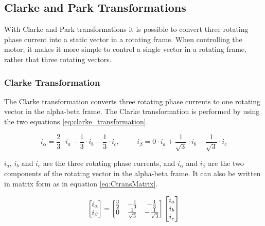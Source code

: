 
\subsection{Clarke and Park Transformations}
With Clarke and Park transformations it is possible to convert three rotating phase current into a static vector in a rotating frame. When controlling the motor, it makes it more simple to control a single vector in a rotating frame, rather that three rotating vectors.



\subsubsection{Clarke Transformation}
The Clarke transformation converts three rotating phase currents to one rotating vector in the alpha-beta frame. The Clarke transformation is performed by using the two equations \ref{eq:clarke_transformation}.

\begin{equation}
    i_{\alpha} = \frac{2}{3} \cdot i_a - \frac{1}{3} \cdot i_b - \frac{1}{3} \cdot i_c
    , \hspace{1cm}
    i_{\beta} = 0 \cdot i_a + \frac{1}{\sqrt{3}} \cdot i_b - \frac{1}{\sqrt{3}} \cdot i_c
    \label{eq:clarke_transformation}
\end{equation}

$i_a$, $i_b$ and $i_c$ are the three rotating phase currents, and $i_\alpha$ and $i_\beta$ are the two components of the rotating vector in the alpha-beta frame.
It can also be written in matrix form as in equation \ref{eq:CtransMatrix}. 

\begin{equation}
    \centering
    \begin{bmatrix}
        i_{\alpha} \\ 
        i_{\beta}
    \end{bmatrix}
    =
    \begin{bmatrix}
        \frac{3}{2} & -\frac{1}{3} & -\frac{1}{3} \\
        0 & \frac{1}{\sqrt{3}} & -\frac{1}{\sqrt{3}} \\
    \end{bmatrix}
    \begin{bmatrix}
        i_{a} \\ 
        i_{b} \\ 
        i_{c}
    \end{bmatrix}
    \label{eq:CtransMatrix}
\end{equation}


